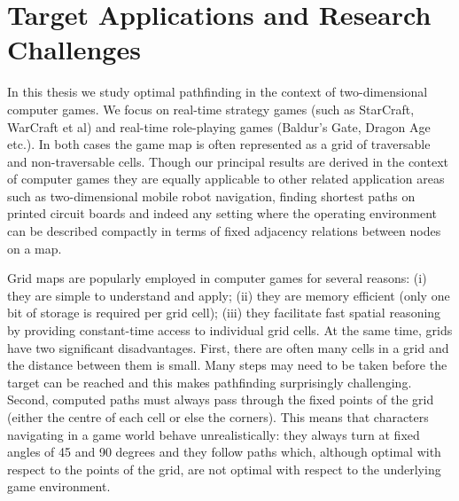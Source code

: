 \section{Target Applications and Research Challenges}
\label{cha::intro::challenges}
In this thesis we study optimal pathfinding in the context of two-dimensional
computer games. We focus on real-time strategy games (such as
StarCraft, WarCraft et al) and real-time role-playing games (Baldur's Gate,
Dragon Age etc.). In both cases the game map is often represented as a grid of 
traversable and non-traversable cells. Though our principal results
are derived in the context of computer games they are equally applicable to
other related application areas such as two-dimensional mobile robot navigation,
finding shortest paths on printed circuit boards and indeed any setting where the 
operating environment can be described compactly in terms of fixed adjacency
relations between nodes on a map.


%

Grid maps are popularly employed in computer games for several reasons: 
(i) they are simple to understand and apply; (ii) they are memory efficient (only one bit of storage is required per grid cell); (iii) 
they facilitate fast spatial reasoning by providing constant-time
access to individual grid cells. At the same time, grids have two significant
disadvantages.
First, there are often many cells in a grid and the distance between them is small.
Many steps may need to be taken before the target can be reached and this 
makes pathfinding surprisingly challenging. Second, computed paths must always pass through the fixed points of the grid (either
the centre of each cell or else the corners). 
This means that characters navigating in a game world behave
unrealistically: they always turn at fixed angles of 45 and 90 degrees and
they follow paths which, although optimal with respect to the points of the
grid, are not optimal with respect to the underlying game environment.

